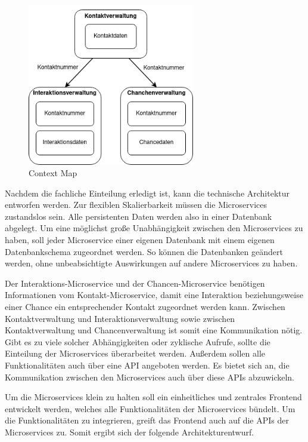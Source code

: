 \begin{figure}[H] 
    \centering
    \includegraphics[width=0.65\textwidth]{figures/ContextMap.png}
    \caption{Context Map}
    \label{fig:CRMENTWURF}
\end{figure}

Nachdem die fachliche Einteilung erledigt ist, kann die technische Architektur entworfen werden. Zur flexiblen Skalierbarkeit müssen die Microservices zustandslos sein. Alle persistenten Daten werden also in einer Datenbank abgelegt. Um eine möglichst große Unabhängigkeit zwischen den Microservices zu haben, soll jeder Microservice einer eigenen Datenbank mit einem eigenen Datenbankschema zugeordnet werden. So können die Datenbanken geändert werden, ohne unbeabsichtigte Auswirkungen auf andere Microservices zu haben.

Der Interaktions-Microservice und der Chancen-Microservice benötigen Informationen vom Kontakt-Microservice, damit eine Interaktion beziehungsweise einer Chance ein entsprechender Kontakt zugeordnet werden kann. Zwischen Kontaktverwaltung und Interaktionsverwaltung sowie zwischen Kontaktverwaltung und Chancenverwaltung ist somit eine Kommunikation nötig. Gibt es zu viele solcher Abhängigkeiten oder zyklische Aufrufe, sollte die Einteilung der Microservices überarbeitet werden. Außerdem sollen alle Funktionalitäten auch über eine API angeboten werden. Es bietet sich an, die Kommunikation zwischen den Microservices auch über diese \acp{API} abzuwickeln. 

Um die Microservices klein zu halten soll ein einheitliches und zentrales Frontend entwickelt werden, welches alle Funktionalitäten der Microservices bündelt. Um die Funktionalitäten zu integrieren, greift das Frontend auch auf die \acp{API} der Microservices zu. Somit ergibt sich der folgende Architekturentwurf.

